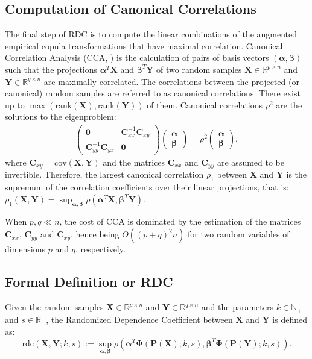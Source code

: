 \documentclass{article}
\begin{document}
\subsection{Computation of Canonical Correlations} \label{sec:comp-canon-corr}
The final step of RDC is to compute the linear combinations of the augmented
empirical copula transformations that have maximal correlation. Canonical
Correlation Analysis (CCA, \cite{Haerdle07}) is the calculation of pairs of
basis vectors $(\bm \alpha, \bm \beta)$ such that the projections $\bm \alpha^T
\bm X$ and $\bm \beta^T \bm Y$ of two random samples $\bm X \in
\mathbb{R}^{p\times n}$ and $\bm Y \in \mathbb{R}^{q\times n}$ are maximally
correlated. The correlations between the projected (or canonical) random
samples are referred to as canonical correlations. There exist up to
$\max(\text{rank}(\bm X), \text{rank}(\bm Y))$ of them. Canonical correlations
$\rho^2$ are the solutions to the eigenproblem:
\begin{align}
  \left(
    \begin{array}{cc}
    \bm 0 & \bm C_{xx}^{-1}\bm C_{xy}\\
    \bm C_{yy}^{-1}\bm C_{yx} & \bm 0
    \end{array}
  \right)
  \left(
    \begin{array}{c}
    \bm \alpha\\
    \bm \beta 
    \end{array}
  \right)
  =
  \rho^2
  \left(
    \begin{array}{c}
    \bm \alpha\\
    \bm \beta 
    \end{array}
  \right)
  ,\label{eq:eigenset}
\end{align}
where $\bm C_{xy} = \text{cov}(\bm X, \bm Y)$ and the matrices $\bm C_{xx}$ and
$\bm C_{yy}$ are assumed to be invertible. Therefore, the largest canonical
correlation $\rho_1$ between $\bm X$ and $\bm Y$ is the supremum of the
correlation coefficients over their linear projections, that is:
$  \rho_1(\bm X, \bm Y) = \sup_{\bm \alpha, \bm \beta} \rho(\bm \alpha^T \bm X,
  \bm \beta^T \bm Y).
$

When $p,q \ll n$, the cost of CCA is dominated by the estimation of the matrices $\bm
C_{xx}$, $\bm C_{yy}$ and $\bm C_{xy}$, hence being $O((p+q)^2n)$ for two
random variables of dimensions $p$ and $q$, respectively.

\subsection{Formal Definition or RDC}
\label{sec:formal-definition-or}
Given the random samples $\bm X \in \mathbb{R}^{p\times n}$ and $\bm Y \in
\mathbb{R}^{q\times n}$ and the parameters $k \in \mathbb{N}_+$ and $s \in
\mathbb{R}_+$, the Randomized Dependence Coefficient between $\bm X$ and $\bm
Y$ is defined as:
\begin{equation}\label{eq:rdc}
  \text{rdc}(\bm X, \bm Y; k,s) :=
  \sup_{\bm \alpha, \bm \beta}\rho\left(
  \bm \alpha^T \bm \Phi(\bm P(\bm X); k, s),
  \bm \beta^T \bm \Phi(\bm P(\bm Y); k, s)\right).
\end{equation}
\end{document}
